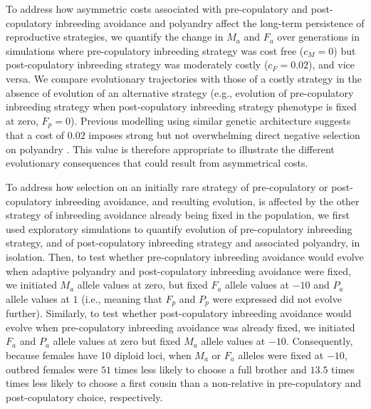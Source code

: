 \documentclass[10pt,letterpaper]{article}
\begin{document}
To address how asymmetric costs associated with pre-copulatory and post-copulatory inbreeding avoidance and polyandry affect the long-term persistence of reproductive strategies, we quantify the change in $M_{a}$ and $F_{a}$ over generations in simulations where pre-copulatory inbreeding strategy was cost free ($c_{M}=0$) but post-copulatory inbreeding strategy was moderately costly ($c_{F}=0.02$), and vice versa. We compare evolutionary trajectories with those of a costly strategy in the absence of evolution of an alternative strategy (e.g., evolution of pre-copulatory inbreeding strategy when post-copulatory inbreeding strategy phenotype is fixed at zero, $F_{p}=0$). Previous modelling using similar genetic architecture suggests that a cost of $0.02$ imposes strong but not overwhelming direct negative selection on polyandry \cite[][]{Duthie}. This value is therefore appropriate to illustrate the different evolutionary consequences that could result from asymmetrical costs.

To address how selection on an initially rare strategy of pre-copulatory or post-copulatory inbreeding avoidance, and resulting evolution, is affected by the other strategy of inbreeding avoidance already being fixed in the population, we first used exploratory simulations to quantify evolution of pre-copulatory inbreeding strategy, and of post-copulatory inbreeding strategy and associated polyandry, in isolation. Then, to test whether pre-copulatory inbreeding avoidance would evolve when adaptive polyandry and post-copulatory inbreeding avoidance were fixed, we initiated $M_{a}$ allele values at zero, but fixed $F_{a}$ allele values at $-10$ and $P_{a}$ allele values at $1$ (i.e., meaning that $F_{p}$ and $P_{p}$ were expressed did not evolve further). Similarly, to test whether post-copulatory inbreeding avoidance would evolve when pre-copulatory inbreeding avoidance was already fixed, we initiated $F_{a}$ and $P_{a}$ allele values at zero but fixed $M_{a}$ allele values at $-10$. Consequently, because females have 10 diploid loci, when $M_{a}$ or $F_{a}$ alleles were fixed at $-10$, outbred females were $51$ times less likely to choose a full brother and $13.5$ times times less likely to choose a first cousin than a non-relative in pre-copulatory and post-copulatory choice, respectively.
\end{document}
